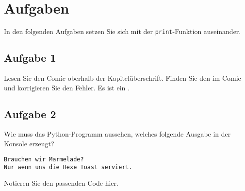 \section{Aufgaben}

In den folgenden Aufgaben setzen Sie sich mit der \lstinline{print}-Funktion auseinander.

\subsection{Aufgabe 1}

Lesen Sie den Comic oberhalb der Kapitelüberschrift. Finden Sie den  im Comic und korrigieren Sie den Fehler. Es ist ein .

\subsection{Aufgabe 2}

Wie muss das Python-Programm aussehen, welches folgende Ausgabe in der Konsole erzeugt?

\begin{lstlisting}[caption={Ausgabe in der Konsole.}, language=output]
Brauchen wir Marmelade?
Nur wenn uns die Hexe Toast serviert.
\end{lstlisting}

Notieren Sie den passenden Code hier.

\fillwithgrid{1.5in}